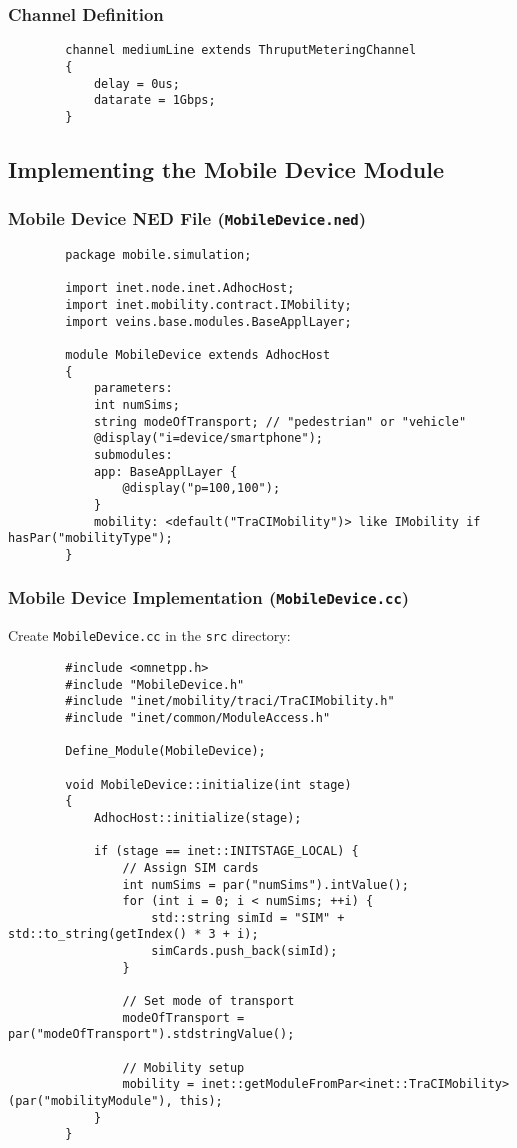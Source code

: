 \documentclass{article}
\begin{document}
	\subsubsection{Channel Definition}
	
	\begin{verbatim}
		channel mediumLine extends ThruputMeteringChannel
		{
			delay = 0us;
			datarate = 1Gbps;
		}
	\end{verbatim}
	
	\subsection{Implementing the Mobile Device Module}
	
	\subsubsection{Mobile Device NED File (\texttt{MobileDevice.ned})}
	
	\begin{verbatim}
		package mobile.simulation;
		
		import inet.node.inet.AdhocHost;
		import inet.mobility.contract.IMobility;
		import veins.base.modules.BaseApplLayer;
		
		module MobileDevice extends AdhocHost
		{
			parameters:
			int numSims;
			string modeOfTransport; // "pedestrian" or "vehicle"
			@display("i=device/smartphone");
			submodules:
			app: BaseApplLayer {
				@display("p=100,100");
			}
			mobility: <default("TraCIMobility")> like IMobility if hasPar("mobilityType");
		}
	\end{verbatim}
	
	\subsubsection{Mobile Device Implementation (\texttt{MobileDevice.cc})}
	
	Create \texttt{MobileDevice.cc} in the \texttt{src} directory:
	
	\begin{verbatim}
		#include <omnetpp.h>
		#include "MobileDevice.h"
		#include "inet/mobility/traci/TraCIMobility.h"
		#include "inet/common/ModuleAccess.h"
		
		Define_Module(MobileDevice);
		
		void MobileDevice::initialize(int stage)
		{
			AdhocHost::initialize(stage);
			
			if (stage == inet::INITSTAGE_LOCAL) {
				// Assign SIM cards
				int numSims = par("numSims").intValue();
				for (int i = 0; i < numSims; ++i) {
					std::string simId = "SIM" + std::to_string(getIndex() * 3 + i);
					simCards.push_back(simId);
				}
				
				// Set mode of transport
				modeOfTransport = par("modeOfTransport").stdstringValue();
				
				// Mobility setup
				mobility = inet::getModuleFromPar<inet::TraCIMobility>(par("mobilityModule"), this);
			}
		}
	\end{verbatim}
	
\end{document}
